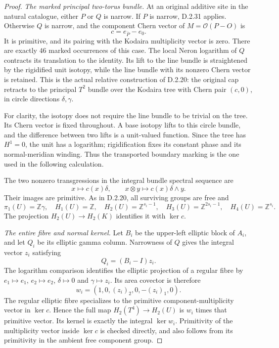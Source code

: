 \begin{proof}
\emph{The marked principal two-torus bundle.}
At an original additive site in the natural catalogue, either
$P$ or $Q$ is narrow. If $P$ is narrow, D.2.31 applies.
Otherwise $Q$ is narrow, and the component Chern vector of
$M=\mathcal O(P-O)$ is
\[
 c=e_{\overline P}-e_0.
\]
It is primitive, and its pairing with the Kodaira
multiplicity vector is zero. There are exactly $46$ marked
occurrences of this case. The local Neron logarithm of $Q$
contracts its translation to the identity. Its lift to the
line bundle is straightened by the rigidified unit isotopy,
while the line bundle with its nonzero Chern vector is
retained. This is the actual relative construction of
D.2.20: the original cap retracts to the principal $T^2$
bundle over the Kodaira tree with Chern pair $(c,0)$, in
circle directions $\delta,\gamma$.

For clarity, the isotopy does not require the line bundle
to be trivial on the tree. Its Chern vector is fixed
throughout. A base isotopy lifts to this circle bundle,
and the difference between two lifts is a unit-valued
function. Since the tree has $H^1=0$, the unit has a
logarithm; rigidification fixes its constant phase and its
normal-meridian winding. Thus the transported boundary
marking is the one used in the following calculation.

The two nonzero transgressions in the integral bundle
spectral sequence are
\[
 x\longmapsto c(x)\delta,\qquad
 x\otimes y\longmapsto c(x)\delta\wedge y.
\]
Their images are primitive. As in D.2.20, all surviving
groups are free and
\[
 \pi_1(U)=\mathbb Z\gamma,\quad
 H_1(U)=\mathbb Z,\quad H_2(U)=\mathbb Z^{s_i-1},\quad
 H_3(U)=\mathbb Z^{2s_i-1},\quad H_4(U)=\mathbb Z^{s_i}.
                                                               \tag{D.OC4}
\]
The projection $H_2(U)\to H_2(K)$ identifies it with
$\ker c$.

\emph{The entire fibre and normal kernel.}
Let $B_i$ be the upper-left elliptic block of $A_i$, and
let $Q_i$ be its elliptic gamma column. Narrowness of $Q$
gives the integral vector $z_i$ satisfying
\[
 Q_i=(B_i-I)z_i.
\]
The logarithm comparison identifies the elliptic projection
of a regular fibre by
$e_1\mapsto e_1$, $e_2\mapsto e_2$, $\delta\mapsto0$ and
$\gamma\mapsto z_i$. Its area covector is therefore
\[
 w_i=(1,0,(z_i)_2,0,-(z_i)_1,0).                            \tag{D.OC5}
\]
The regular elliptic fibre specializes to the primitive
component-multiplicity vector in $\ker c$. Hence the full
map $H_2(T^4)\to H_2(U)$ is $w_i$ times that primitive
vector. Its kernel is exactly the integral $\ker w_i$.
Primitivity of the multiplicity vector inside $\ker c$
is checked directly, and also follows from its primitivity
in the ambient free component group.


\end{proof}
